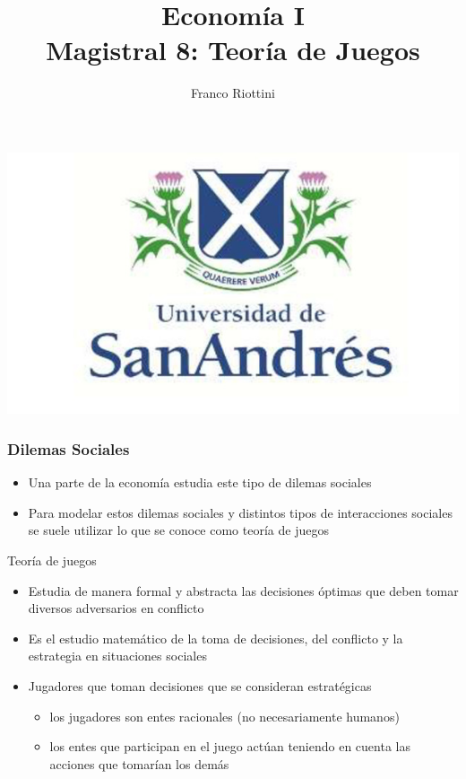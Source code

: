 \documentclass{beamer}
\title[Economía I]{Economía I \vspace{4mm}
\\ Magistral 8: Teoría de Juegos}
\date{}
\author[Riottini]{Franco Riottini}
\institute[]{Universidad de San Andrés}
\begin{document}
\begin{frame}
\titlepage
\centering
\includegraphics[scale=0.2]{../Figures/logoUDESA.jpg} 
\end{frame}

\begin{frame}
\frametitle{Dilemas Sociales}
\begin{itemize}
    \item Una parte de la economía estudia este tipo de dilemas sociales
    \item Para modelar estos dilemas sociales y distintos tipos de interacciones sociales se suele utilizar lo que se conoce como teoría de juegos
    \end{itemize}
\end{frame}

\begin{frame}{Teoría de juegos}
    \begin{itemize}
        \item Estudia de manera formal y abstracta las decisiones óptimas que deben tomar diversos adversarios en conflicto
        \item Es el estudio matemático de la toma de decisiones, del conflicto y la estrategia en situaciones sociales
        \item Jugadores que toman decisiones que se consideran estratégicas
        \begin{itemize}
            \item los jugadores son entes racionales (no necesariamente humanos)
            \item los entes que participan en el juego actúan teniendo en cuenta las acciones que tomarían los demás
        \end{itemize}
    \end{itemize}
\end{frame}
\end{document}
